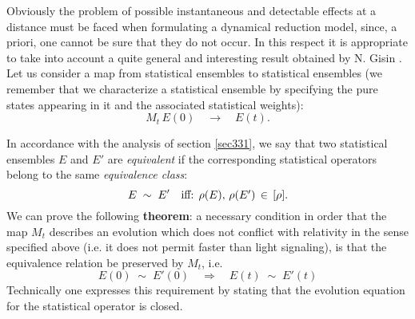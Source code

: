 \documentclass[12pt]{article}
\begin{document}
Obviously the problem of possible instantaneous and detectable
effects at a distance must be faced when formulating a dynamical
reduction model, since, a priori, one cannot be sure that they do
not occur. In this respect it is appropriate to take into account
a quite general and interesting result obtained by N. Gisin
\cite{gisfl}. Let us consider a map from statistical ensembles to
statistical ensembles (we remember that we characterize a
statistical ensemble by specifying the pure states appearing in it
and the associated statistical weights):
\begin{equation}
M_{t}\, E(0) \quad \longrightarrow \quad E(t).
\end{equation}

In accordance with the analysis of section \ref{sec331}, we say
that two statistical ensembles $E$ and $E'$ are {\it equivalent}
if the corresponding statistical operators belong to the same {\it
equivalence class}:
\begin{equation}
E \; \sim \; E' \quad \makebox{iff: $\rho(E),\, \rho(E')\, \in \,
[\rho]$}.
\end{equation}
We can prove the following {\bf theorem}: a necessary condition in
order that the map $M_{t}$ describes an evolution which does not
conflict with relativity in the sense specified above (i.e. it
does not permit  faster than light signaling), is that the
equivalence relation be preserved by $M_{t}$, i.e.
\begin{equation}
E(0) \; \sim \; E'(0) \quad \Longrightarrow \quad E(t) \; \sim \;
E'(t)
\end{equation}
Technically one expresses this requirement by stating that the
evolution equation for the statistical operator is closed.
\end{document}
